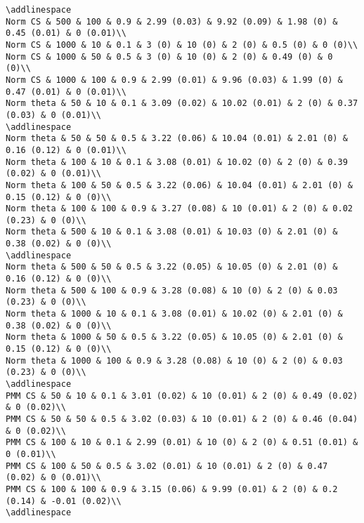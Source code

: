 \documentclass[
]{article}
\begin{document}
\begin{verbatim}
\addlinespace
Norm CS & 500 & 100 & 0.9 & 2.99 (0.03) & 9.92 (0.09) & 1.98 (0) & 0.45 (0.01) & 0 (0.01)\\
Norm CS & 1000 & 10 & 0.1 & 3 (0) & 10 (0) & 2 (0) & 0.5 (0) & 0 (0)\\
Norm CS & 1000 & 50 & 0.5 & 3 (0) & 10 (0) & 2 (0) & 0.49 (0) & 0 (0)\\
Norm CS & 1000 & 100 & 0.9 & 2.99 (0.01) & 9.96 (0.03) & 1.99 (0) & 0.47 (0.01) & 0 (0.01)\\
Norm theta & 50 & 10 & 0.1 & 3.09 (0.02) & 10.02 (0.01) & 2 (0) & 0.37 (0.03) & 0 (0.01)\\
\addlinespace
Norm theta & 50 & 50 & 0.5 & 3.22 (0.06) & 10.04 (0.01) & 2.01 (0) & 0.16 (0.12) & 0 (0.01)\\
Norm theta & 100 & 10 & 0.1 & 3.08 (0.01) & 10.02 (0) & 2 (0) & 0.39 (0.02) & 0 (0.01)\\
Norm theta & 100 & 50 & 0.5 & 3.22 (0.06) & 10.04 (0.01) & 2.01 (0) & 0.15 (0.12) & 0 (0)\\
Norm theta & 100 & 100 & 0.9 & 3.27 (0.08) & 10 (0.01) & 2 (0) & 0.02 (0.23) & 0 (0)\\
Norm theta & 500 & 10 & 0.1 & 3.08 (0.01) & 10.03 (0) & 2.01 (0) & 0.38 (0.02) & 0 (0)\\
\addlinespace
Norm theta & 500 & 50 & 0.5 & 3.22 (0.05) & 10.05 (0) & 2.01 (0) & 0.16 (0.12) & 0 (0)\\
Norm theta & 500 & 100 & 0.9 & 3.28 (0.08) & 10 (0) & 2 (0) & 0.03 (0.23) & 0 (0)\\
Norm theta & 1000 & 10 & 0.1 & 3.08 (0.01) & 10.02 (0) & 2.01 (0) & 0.38 (0.02) & 0 (0)\\
Norm theta & 1000 & 50 & 0.5 & 3.22 (0.05) & 10.05 (0) & 2.01 (0) & 0.15 (0.12) & 0 (0)\\
Norm theta & 1000 & 100 & 0.9 & 3.28 (0.08) & 10 (0) & 2 (0) & 0.03 (0.23) & 0 (0)\\
\addlinespace
PMM CS & 50 & 10 & 0.1 & 3.01 (0.02) & 10 (0.01) & 2 (0) & 0.49 (0.02) & 0 (0.02)\\
PMM CS & 50 & 50 & 0.5 & 3.02 (0.03) & 10 (0.01) & 2 (0) & 0.46 (0.04) & 0 (0.02)\\
PMM CS & 100 & 10 & 0.1 & 2.99 (0.01) & 10 (0) & 2 (0) & 0.51 (0.01) & 0 (0.01)\\
PMM CS & 100 & 50 & 0.5 & 3.02 (0.01) & 10 (0.01) & 2 (0) & 0.47 (0.02) & 0 (0.01)\\
PMM CS & 100 & 100 & 0.9 & 3.15 (0.06) & 9.99 (0.01) & 2 (0) & 0.2 (0.14) & -0.01 (0.02)\\
\addlinespace

\end{verbatim}
\end{document}
